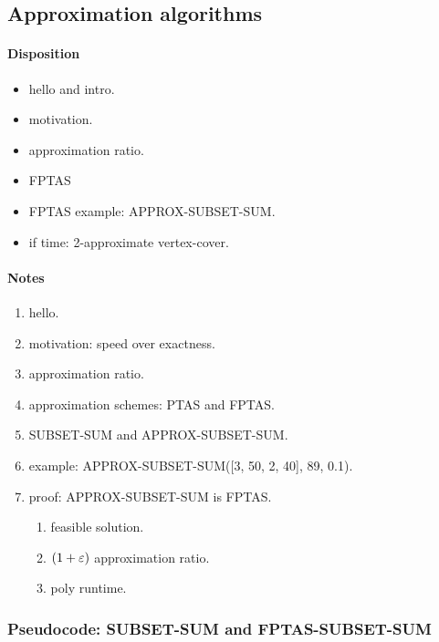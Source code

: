 \newpage

\subsection{Approximation algorithms}

\paragraph{Disposition}

\begin{itemize}
  \item hello and intro.
  \item motivation.
  \item approximation ratio.\\
  \item FPTAS
  \item FPTAS example: APPROX-SUBSET-SUM.
  \item if time: 2-approximate vertex-cover.
\end{itemize}

\paragraph{Notes}

\begin{enumerate}
  \item hello.
  \item motivation: speed over exactness.
  \item approximation ratio.
  \item approximation schemes: PTAS and FPTAS.\\

  \item SUBSET-SUM and APPROX-SUBSET-SUM.
  \item example: APPROX-SUBSET-SUM([3, 50, 2, 40], 89, 0.1).\\

  \item proof: APPROX-SUBSET-SUM is FPTAS.
    \begin{enumerate}
      \item feasible solution.
      \item $(1 + \varepsilon)$ approximation ratio.
      \item poly runtime.
    \end{enumerate}
\end{enumerate}

\newpage
\subsubsection{Pseudocode: SUBSET-SUM and FPTAS-SUBSET-SUM}
\label{sec:fptas_subset_sum_pseudocode}

